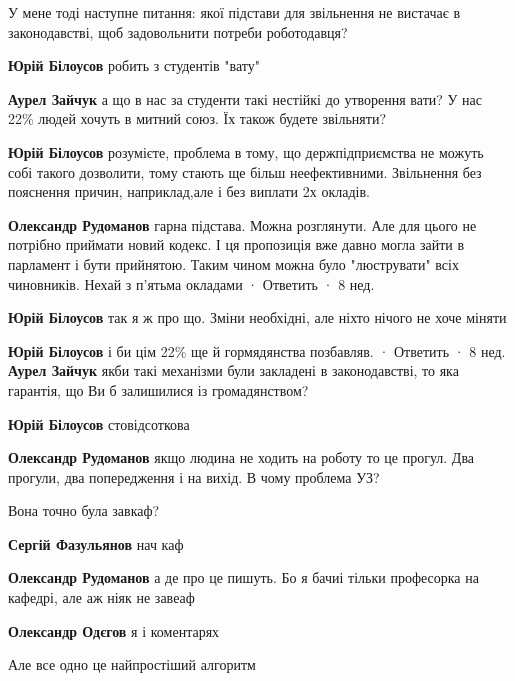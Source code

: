 \begin{itemize}
\begin{itemize}
У мене тоді наступне питання: якої підстави для звільнення не вистачає в
законодавстві, щоб задовольнити потреби роботодавця?

\textbf{Юрій Білоусов} робить з студентів "вату"

\textbf{Аурел Зайчук} а що в нас за студенти такі нестійкі до утворення вати? У нас 22\% людей хочуть в митний союз. Їх також будете звільняти?


\textbf{Юрій Білоусов} розумієте, проблема в тому, що держпідприємства не можуть собі такого дозволити, тому стають ще більш неефективними.
Звільнення без пояснення причин, наприклад,але і без виплати 2х окладів.

\textbf{Олександр Рудоманов} гарна підстава. Можна розглянути. Але для цього не потрібно приймати новий кодекс. І ця пропозиція вже давно могла зайти в парламент і бути прийнятою. Таким чином можна було "люструвати" всіх чиновників. Нехай з п'ятьма окладами
 · Ответить · 8 нед.

\textbf{Юрій Білоусов} так я ж про що. Зміни необхідні, але ніхто нічого не хоче міняти

\textbf{Юрій Білоусов} і би цім 22\% ще й гормядянства позбавляв.
 · Ответить · 8 нед.
\textbf{Аурел Зайчук} якби такі механізми були закладені в законодавстві, то яка гарантія, що Ви б залишилися із громадянством?

\textbf{Юрій Білоусов} стовідсоткова

\textbf{Олександр Рудоманов} якщо людина не ходить на роботу то це прогул. Два прогули, два попередження і на вихід. В чому проблема УЗ?

\end{itemize} %

Вона точно була завкаф?

\begin{itemize} %

\textbf{Сергій Фазульянов} нач каф

\textbf{Олександр Рудоманов} а де про це пишуть. Бо я бачиі тільки професорка на кафедрі, але аж ніяк не завеаф


\textbf{Олександр Одєгов} я і коментарях


Але все одно це найпростіший алгоритм


\end{itemize}
\end{itemize}
